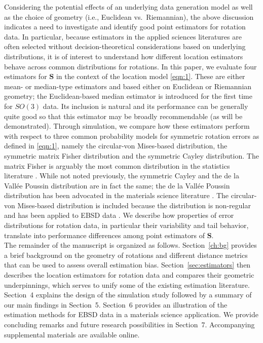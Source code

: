 Considering the potential effects of an underlying data generation model as well as the choice of geometry (i.e., Euclidean vs.~Riemannian), the above discussion indicates a need to investigate and identify good point estimators for rotation data.  In particular, because estimators in the applied sciences literatures  are often selected without decision-theoretical considerations based on underlying distributions, it is of interest to understand how different location estimators behave across common distributions for rotations.  In this paper, we evaluate four estimators for $\bm S$ in the context of the location model \eqref{eqn:1}. These are either mean- or median-type estimators and based either on Euclidean or Riemannian geometry; the Euclidean-based median estimator is introduced for the first time for $SO(3)$ data. Its inclusion is natural and its performance can be generally quite good so that this estimator may be broadly recommendable (as will be demonstrated).   Through simulation, we compare how these estimators perform with respect to three common probability models for symmetric rotation errors as defined in \eqref{eqn:1}, namely the circular-von Mises-based distribution, the symmetric matrix Fisher distribution and the symmetric Cayley distribution.  The matrix Fisher is arguably the most common distribution in the statistics literature \citep[see][]{chikuse03}. While not noted previously, the symmetric Cayley and the de la Vall\'{e}e Poussin distribution are in fact the same; the de la Vall\'{e}e Poussin distribution has been advocated in the materials science literature \citep{Schaeben97}.   The circular-von Mises-based distribution is included because the distribution is non-regular and has been applied to EBSD data \citep{bingham09}.  We describe how properties of error distributions for rotation data, in particular their variability and tail behavior, translate into performance differences among point estimators of $\bm S$.\\
The remainder of the manuscript is organized  as follows.  Section~\ref{ch:bg} provides a brief background on the geometry of rotations and different distance metrics that can be used to assess overall estimation bias.   Section~\ref{sec:estimators} then describes the location estimators for rotation data  and compares their geometric underpinnings, which  serves to unify some of the existing estimation literature.  Section~4 explains the design of the simulation study followed by a summary of our main findings in Section~5. Section~6 provides an illustration of the estimation methods for EBSD data in a materials science application. We provide concluding remarks and future research possibilities in Section~7. Accompanying supplemental materials are available online.
